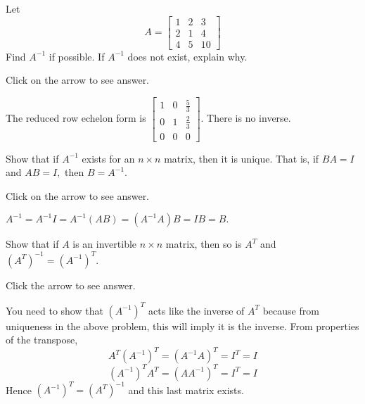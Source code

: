 \documentclass{ximera}
\begin{document}
\begin{problem}\label{prb:4.42}Let
\begin{equation*}
A=\left[
\begin{array}{rrr}
1 & 2 & 3 \\
2 & 1 & 4 \\
4 & 5 & 10
\end{array}
\right]
\end{equation*}
Find $A^{-1}$ if possible. If $A^{-1}$ does not exist, explain why.

Click on the arrow to see answer.
\begin{expandable}{}{}
The reduced row echelon form is
$\left[
\begin{array}{ccc}
1 & 0 &  \frac{5}{3} \\
0 & 1 &  \frac{2}{3} \\
0 & 0 & 0
\end{array}
\right]$. There is no inverse.
\end{expandable}
\end{problem}

\begin{problem}\label{prb:4.48}
Show that if $A^{-1}$ exists for an $n\times n$
matrix, then it is unique. That is, if $BA=I$ and $AB=I,$ then $B=A^{-1}.$

Click on the arrow to see answer.
\begin{expandable}{}{}
 $A^{-1}=A^{-1}I=A^{-1}\left( AB\right) =\left( A^{-1}A\right) B=IB=B.$
\end{expandable}
\end{problem}

\begin{problem}\label{prb:4.49}Show that if $A$ is an invertible $n\times n$ matrix, then so is
$A^{T} $ and $\left( A^{T}\right) ^{-1}=\left( A^{-1}\right) ^{T}.$

Click the arrow to see answer.

\begin{expandable}{}{}
 You need to show that $\left( A^{-1}\right) ^{T}$ acts like the inverse of $A^{T}
$ because from uniqueness in the above problem, this will imply it is the
inverse. From properties of the transpose,
$$
A^{T}\left( A^{-1}\right) ^{T} =\left( A^{-1}A\right) ^{T}=I^{T}=I $$
$$\left( A^{-1}\right) ^{T}A^{T} =\left( AA^{-1}\right) ^{T}=I^{T}=I
$$
Hence $\left( A^{-1}\right) ^{T}=\left( A^{T}\right) ^{-1}$ and this last
matrix exists.
\end{expandable}
\end{problem}
\end{document}
